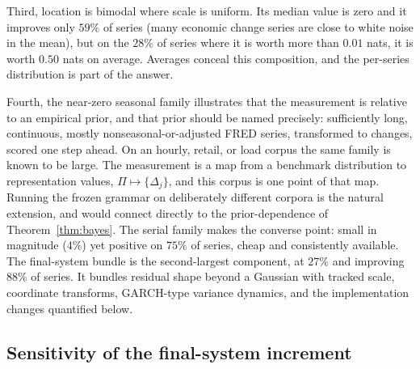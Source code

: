 \documentclass[11pt]{article}
\theoremstyle{remark}
\begin{document}
Third, location is bimodal where scale is uniform. Its median value is zero and it improves
only $59\%$ of series (many economic change series are close to white noise in the mean),
but on the $28\%$ of series where it is worth more than $0.01$ nats, it is worth $0.50$ nats on
average. Averages conceal this composition, and the per-series distribution is part of the
answer.

Fourth, the near-zero seasonal family illustrates that the measurement is relative to an
empirical prior, and that prior should be named precisely: sufficiently long, continuous,
mostly nonseasonal-or-adjusted FRED series, transformed to changes, scored one step ahead. On
an hourly, retail, or load corpus the same family is known to be large. The measurement is a map from a benchmark distribution to representation values,
$\Pi\mapsto\{\Delta_j\}$, and this corpus is one point of that map. Running the frozen
grammar on deliberately different corpora is the natural extension, and would connect
directly to the prior-dependence of Theorem~\ref{thm:bayes}. The serial family makes the converse point: small in magnitude ($4\%$)
yet positive on $75\%$ of series, cheap and consistently available. The final-system bundle is the second-largest component, at $27\%$ and improving $88\%$
of series. It bundles residual shape beyond a Gaussian with tracked scale, coordinate
transforms, GARCH-type variance dynamics, and the implementation changes quantified below.

\subsection*{Sensitivity of the final-system increment}
\end{document}
